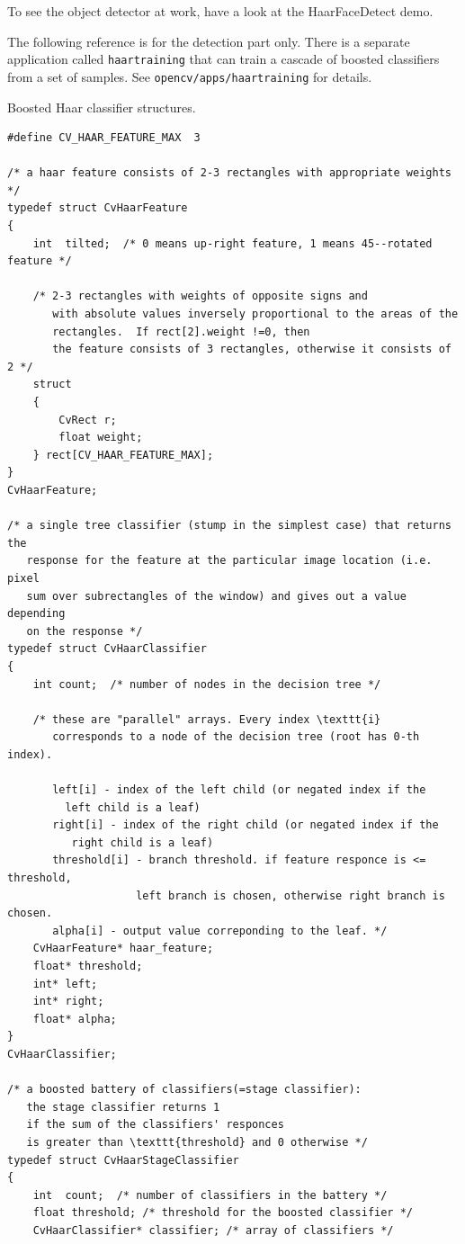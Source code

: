To see the object detector at work, have a look at the HaarFaceDetect demo.

The following reference is for the detection part only. There
is a separate application called \texttt{haartraining} that can
train a cascade of boosted classifiers from a set of samples. See
\texttt{opencv/apps/haartraining} for details.

\label{CvHaarFeature}
\label{CvHaarClassifier}
\label{CvHaarStageClassifier}
\label{CvHaarClassifierCascade}

Boosted Haar classifier structures.

\begin{lstlisting}
#define CV_HAAR_FEATURE_MAX  3

/* a haar feature consists of 2-3 rectangles with appropriate weights */
typedef struct CvHaarFeature
{
    int  tilted;  /* 0 means up-right feature, 1 means 45--rotated feature */

    /* 2-3 rectangles with weights of opposite signs and
       with absolute values inversely proportional to the areas of the 
       rectangles.  If rect[2].weight !=0, then
       the feature consists of 3 rectangles, otherwise it consists of 2 */
    struct
    {
        CvRect r;
        float weight;
    } rect[CV_HAAR_FEATURE_MAX];
}
CvHaarFeature;

/* a single tree classifier (stump in the simplest case) that returns the 
   response for the feature at the particular image location (i.e. pixel 
   sum over subrectangles of the window) and gives out a value depending 
   on the response */
typedef struct CvHaarClassifier
{
    int count;  /* number of nodes in the decision tree */

    /* these are "parallel" arrays. Every index \texttt{i}
       corresponds to a node of the decision tree (root has 0-th index).

       left[i] - index of the left child (or negated index if the 
		 left child is a leaf)
       right[i] - index of the right child (or negated index if the 
		  right child is a leaf)
       threshold[i] - branch threshold. if feature responce is <= threshold, 
                    left branch is chosen, otherwise right branch is chosen.
       alpha[i] - output value correponding to the leaf. */
    CvHaarFeature* haar_feature;
    float* threshold;
    int* left;
    int* right;
    float* alpha;
}
CvHaarClassifier;

/* a boosted battery of classifiers(=stage classifier):
   the stage classifier returns 1
   if the sum of the classifiers' responces
   is greater than \texttt{threshold} and 0 otherwise */
typedef struct CvHaarStageClassifier
{
    int  count;  /* number of classifiers in the battery */
    float threshold; /* threshold for the boosted classifier */
    CvHaarClassifier* classifier; /* array of classifiers */


\end{lstlisting}

